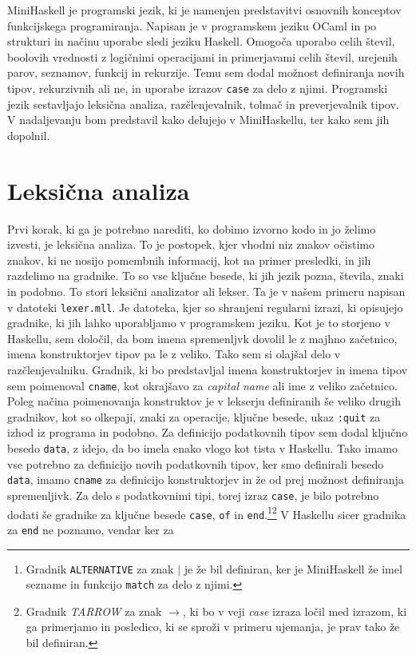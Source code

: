 \documentclass[a4paper,12pt,openright]{book}
\begin{document}
MiniHaskell je programski jezik, ki je namenjen predstavitvi osnovnih konceptov funkcijskega programiranja. Napisan je v programskem jeziku 
OCaml in po strukturi in načinu uporabe sledi jeziku Haskell. Omogoča uporabo celih števil, boolovih vrednosti z logičnimi operacijami in primerjavami 
celih števil, urejenih parov, seznamov, funkcij in rekurzije. Temu sem dodal možnost definiranja novih tipov, rekurzivnih ali ne, in 
uporabe izrazov \lstinline{case} za delo z njimi. Programski jezik sestavljajo leksična analiza, razčlenjevalnik, tolmač in preverjevalnik tipov. V nadaljevanju bom predstavil kako 
delujejo v MiniHaskellu, ter kako sem jih dopolnil.

\section{Leksična analiza}
Prvi korak, ki ga je potrebno narediti, ko dobimo izvorno kodo in jo želimo izvesti, je leksična analiza. To je postopek, kjer vhodni niz znakov očistimo znakov, ki ne nosijo pomembnih informacij, kot 
na primer presledki, in jih razdelimo na gradnike. To so vse ključne besede, ki jih jezik pozna, števila, znaki in podobno. To stori leksični analizator ali lekser. 
Ta je v našem primeru napisan v datoteki \lstinline{lexer.mll}. Je datoteka, kjer so shranjeni regularni izrazi, ki opisujejo gradnike, ki jih lahko uporabljamo v programskem jeziku. 
Kot je to storjeno v Haskellu, sem določil, da bom imena spremenljvk dovolil le z majhno začetnico, imena konstruktorjev tipov pa le z veliko. Tako sem si olajšal delo v razčlenjevalniku. 
Gradnik, ki bo predstavljal imena konstruktorjev in imena tipov sem poimenoval \lstinline{cname}, kot okrajšavo za \textit{capital name} ali ime z veliko začetnico. Poleg načina poimenovanja 
konstruktov je v lekserju definiranih še veliko drugih gradnikov, kot so olkepaji, znaki za operacije, ključne besede, ukaz \lstinline{:quit} za izhod iz programa 
in podobno. Za definicijo podatkovnih tipov sem dodal ključno besedo \lstinline{data}, z idejo, da bo imela enako vlogo kot tista v Haskellu. Tako imamo vse potrebno za 
definicijo novih podatkovnih tipov, ker smo definirali besedo \lstinline{data}, imamo \lstinline{cname} za definicijo konstruktorjev in že od prej možnost definiranja spremenljivk.
Za delo s podatkovnimi tipi, torej izraz \lstinline{case}, je bilo potrebno dodati še gradnike za ključne besede \lstinline{case}, \lstinline{of} in \lstinline{end}.\footnote{Gradnik \lstinline{ALTERNATIVE} 
za znak $\mid$ je že bil definiran, ker je MiniHaskell že imel sezname in funkcijo \lstinline{match} za delo z njimi.}\footnote{Gradnik \emph{TARROW} za znak \emph{$\rightarrow$}, ki bo v veji \emph{case} 
izraza ločil med izrazom, ki ga primerjamo in posledico, ki se sproži v primeru ujemanja, je prav tako že bil definiran.} V Haskellu sicer gradnika za \lstinline{end} ne poznamo, vendar ker za 
\end{document}
